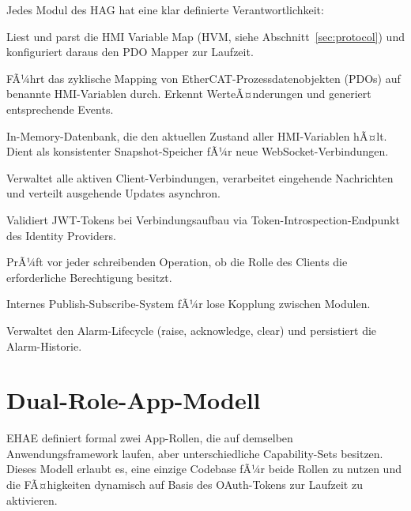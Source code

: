 ﻿\documentclass[12pt,a4paper]{article}
\begin{document}
Jedes Modul des HAG hat eine klar definierte Verantwortlichkeit:

\begin{description}[leftmargin=2em]
  \item[Config Loader] Liest und parst die HMI Variable Map (HVM, siehe
    Abschnitt~\ref{sec:protocol}) und konfiguriert daraus den PDO Mapper zur Laufzeit.
  \item[PDO Mapper] FÃ¼hrt das zyklische Mapping von EtherCAT-Prozessdatenobjekten
    (PDOs) auf benannte HMI-Variablen durch. Erkennt WerteÃ¤nderungen und generiert
    entsprechende Events.
  \item[Variable Database] In-Memory-Datenbank, die den aktuellen Zustand aller
    HMI-Varia\-blen hÃ¤lt. Dient als konsistenter Snapshot-Speicher fÃ¼r neue
    WebSocket-Verbindungen.
  \item[WebSocket Server] Verwaltet alle aktiven Client-Verbindungen, verarbeitet
    eingehende Nachrichten und verteilt ausgehende Updates asynchron.
  \item[Auth Broker] Validiert JWT-Tokens bei Verbindungsaufbau via
    Token-Introspection-Endpunkt des Identity Providers.
  \item[RBAC Engine] PrÃ¼ft vor jeder schreibenden Operation, ob die Rolle des Clients die
    erforderliche Berechtigung besitzt.
  \item[Event Bus] Internes Publish-Subscribe-System fÃ¼r lose Kopplung zwischen Modulen.
  \item[Alarm Manager] Verwaltet den Alarm-Lifecycle (raise, acknowledge, clear) und
    persistiert die Alarm-Historie.
\end{description}

\section{Dual-Role-App-Modell}
\label{sec:dualrole}

EHAE definiert formal zwei App-Rollen, die auf demselben Anwendungsframework laufen,
aber unterschiedliche Capability-Sets besitzen. Dieses Modell erlaubt es, eine einzige
Codebase fÃ¼r beide Rollen zu nutzen und die FÃ¤higkeiten dynamisch auf Basis des
OAuth-Tokens zur Laufzeit zu aktivieren.
\end{document}
